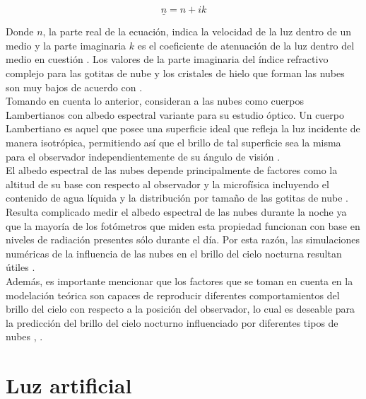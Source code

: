 \begin{equation}
\underline{n} = n + i k
\end{equation}

\vspace{2mm} 

Donde $n$, la parte real de la ecuación, indica la velocidad de la luz dentro de un medio y la parte imaginaria $k$ es el coeficiente de atenuación de la luz dentro del medio en cuestión \citep{Born&Wolf2003}. Los valores de la parte imaginaria del índice refractivo complejo para las gotitas de nube y los cristales de hielo que forman las nubes son muy bajos de acuerdo con \cite{Solano2015}.\\

Tomando en cuenta lo anterior, \cite{Solano2015} consideran a las nubes como cuerpos Lambertianos con albedo espectral variante para su estudio óptico. Un cuerpo Lambertiano es aquel que posee una superficie ideal que refleja la luz incidente de manera isotrópica, permitiendo así que el brillo de tal superficie sea la misma para el observador independientemente de su ángulo de visión \citep{Born&Wolf2003}.\\

El albedo espectral de las nubes depende principalmente de factores como la altitud de su base con respecto al observador y la microfísica incluyendo el contenido de agua líquida y la distribución por tamaño de las gotitas de nube \citep{Kocifaj2007}.\\ 

Resulta complicado medir el albedo espectral de las nubes durante la noche ya que la mayoría de los fotómetros que miden esta propiedad funcionan con base en niveles de radiación presentes sólo durante el día. Por esta razón, las simulaciones numéricas de la influencia de las nubes en el brillo del cielo nocturna resultan útiles \citep{Solano2015}.\\

Además, es importante mencionar que los factores que se toman en cuenta en la modelación teórica son capaces de reproducir diferentes comportamientos del brillo del cielo con respecto a la posición del observador, lo cual es deseable para la predicción del brillo del cielo nocturno influenciado por diferentes tipos de nubes \citep{Kocifaj2007}, \citep{Solano2015}.

\newpage

\section{Luz artificial}\\
\label{sec:luzartificial}

